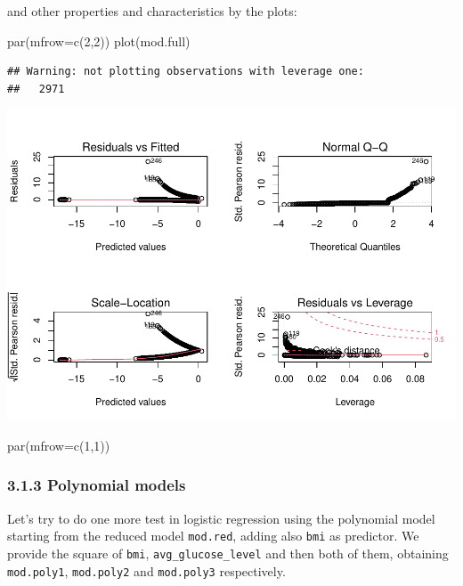 \documentclass[
]{article}
\newenvironment{Shaded}{\begin{snugshade}}{\end{snugshade}}
\newcommand{\AttributeTok}[1]{\textcolor[rgb]{0.77,0.63,0.00}{#1}}
\newcommand{\DecValTok}[1]{\textcolor[rgb]{0.00,0.00,0.81}{#1}}
\newcommand{\FunctionTok}[1]{\textcolor[rgb]{0.00,0.00,0.00}{#1}}
\newcommand{\NormalTok}[1]{#1}
\begin{document}
and other properties and characteristics by the plots:

\begin{Shaded}
\begin{Highlighting}[]
\FunctionTok{par}\NormalTok{(}\AttributeTok{mfrow=}\FunctionTok{c}\NormalTok{(}\DecValTok{2}\NormalTok{,}\DecValTok{2}\NormalTok{))}
\FunctionTok{plot}\NormalTok{(mod.full)}
\end{Highlighting}
\end{Shaded}

\begin{verbatim}
## Warning: not plotting observations with leverage one:
##   2971
\end{verbatim}

\includegraphics{stat-project-stroke_files/figure-latex/unnamed-chunk-27-1.pdf}

\begin{Shaded}
\begin{Highlighting}[]
\FunctionTok{par}\NormalTok{(}\AttributeTok{mfrow=}\FunctionTok{c}\NormalTok{(}\DecValTok{1}\NormalTok{,}\DecValTok{1}\NormalTok{))}
\end{Highlighting}
\end{Shaded}

\hypertarget{polynomial-models}{%
\subsubsection{3.1.3 Polynomial models}\label{polynomial-models}}

Let's try to do one more test in logistic regression using the
polynomial model starting from the reduced model \texttt{mod.red},
adding also \texttt{bmi} as predictor. We provide the square of
\texttt{bmi}, \texttt{avg\_glucose\_level} and then both of them,
obtaining \texttt{mod.poly1}, \texttt{mod.poly2} and \texttt{mod.poly3}
respectively.
\end{document}
